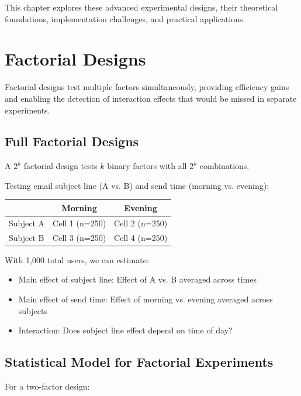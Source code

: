 This chapter explores these advanced experimental designs, their theoretical foundations, implementation challenges, and practical applications.

\section{Factorial Designs}

Factorial designs test multiple factors simultaneously, providing efficiency gains and enabling the detection of interaction effects that would be missed in separate experiments.

\subsection{Full Factorial Designs}

A $2^k$ factorial design tests $k$ binary factors with all $2^k$ combinations.

\begin{example}
Testing email subject line (A vs. B) and send time (morning vs. evening):

\begin{center}
\begin{tabular}{lcc}
\toprule
& \textbf{Morning} & \textbf{Evening} \\
\midrule
Subject A & Cell 1 (n=250) & Cell 2 (n=250) \\
Subject B & Cell 3 (n=250) & Cell 4 (n=250) \\
\bottomrule
\end{tabular}
\end{center}

With 1,000 total users, we can estimate:
\begin{itemize}
    \item Main effect of subject line: Effect of A vs. B averaged across times
    \item Main effect of send time: Effect of morning vs. evening averaged across subjects
    \item Interaction: Does subject line effect depend on time of day?
\end{itemize}
\end{example}

\subsection{Statistical Model for Factorial Experiments}

For a two-factor design:

